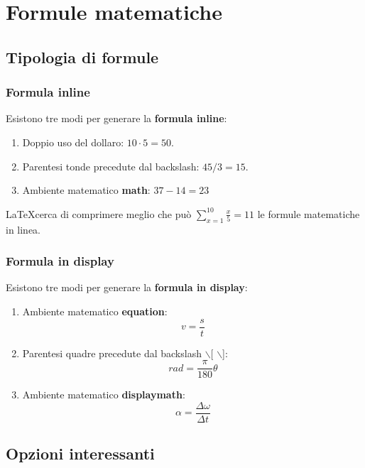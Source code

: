 \documentclass[a4paper,12pt,oneside]{book}
\theoremstyle{plain}
\begin{document}
	
	
	\chapter{Formule matematiche}
	\section{Tipologia di formule}
	\subsection{Formula inline}
	Esistono tre modi per generare la \textbf{formula inline}:
	\begin{enumerate}
		\item Doppio uso del dollaro: $10\cdot 5 = 50$.
		\item Parentesi tonde precedute dal backslash: \(45 / 3 = 15\).
		\item Ambiente matematico \textbf{math}: \begin{math}
			37 - 14 = 23
		\end{math}
	\end{enumerate}
	\LaTeX cerca di comprimere meglio che può $\sum_{x=1}^{10}\frac{x}{5} = 11$ le formule matematiche in linea.
	
	
	\subsection{Formula in display}
	Esistono tre modi per generare la \textbf{formula in display}:
	\begin{enumerate}
		\item Ambiente matematico \textbf{equation}:
		\begin{equation}
			v = \frac{s}{t}
		\end{equation}
		
		\item Parentesi quadre precedute dal backslash $\backslash$[ $\backslash$]:
		\[
		rad = \frac{\pi}{180}\theta
		\]
		
		\item Ambiente matematico \textbf{displaymath}:
		\begin{displaymath}
			\alpha = \frac{\Delta\omega}{\Delta t}
		\end{displaymath}
	\end{enumerate}

	
	\section{Opzioni interessanti}
\end{document}
